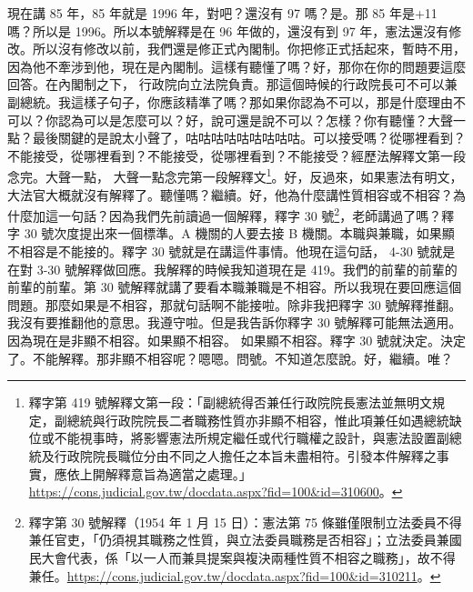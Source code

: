 \hypertarget{c08:cue:67}{}現在講 85 年，85 年就是 1996 年，對吧？還沒有 97 嗎？是。那 85 年是+11 嗎？所以是 1996。所以本號解釋是在 96 年做的，還沒有到 97 年，憲法還沒有修改。所以沒有修改以前，我們還是修正式內閣制。你把修正式括起來，暫時不用，因為他不牽涉到他，現在是內閣制。這樣有聽懂了嗎？好，那你在你的問題要這麼回答。在內閣制之下，
\hypertarget{c08:cue:68}{}行政院向立法院負責。那這個時候的行政院長可不可以兼副總統。我這樣子句子，你應該精準了嗎？那如果你認為不可以，那是什麼理由不可以？你認為可以是怎麼可以？好，說可還是說不可以？怎樣？你有聽懂？大聲一點？最後關鍵的是說太小聲了，咕咕咕咕咕咕咕咕咕。可以接受嗎？從哪裡看到？不能接受，從哪裡看到？不能接受，從哪裡看到？不能接受？經歷法解釋文第一段念完。大聲一點，
\hypertarget{c08:cue:69}{}大聲一點念完第一段解釋文\footnote{釋字第 419 號解釋文第一段：「副總統得否兼任行政院院長憲法並無明文規定，副總統與行政院院長二者職務性質亦非顯不相容，惟此項兼任如遇總統缺位或不能視事時，將影響憲法所規定繼任或代行職權之設計，與憲法設置副總統及行政院院長職位分由不同之人擔任之本旨未盡相符。引發本件解釋之事實，應依上開解釋意旨為適當之處理。」\url{https://cons.judicial.gov.tw/docdata.aspx?fid=100&id=310600}。}。好，反過來，如果憲法有明文，大法官大概就沒有解釋了。聽懂嗎？繼續。好，他為什麼講性質相容或不相容？為什麼加這一句話？因為我們先前讀過一個解釋，釋字 30 號\footnote{釋字第 30 號解釋（1954 年 1 月 15 日）：憲法第 75 條雖僅限制立法委員不得兼任官吏，「仍須視其職務之性質，與立法委員職務是否相容」；立法委員兼國民大會代表，係「以一人而兼具提案與複決兩種性質不相容之職務」，故不得兼任。\url{https://cons.judicial.gov.tw/docdata.aspx?fid=100&id=310211}。}，老師講過了嗎？釋字 30 號次度提出來一個標準。A 機關的人要去接 B 機關。本職與兼職，如果顯不相容是不能接的。釋字 30 號就是在講這件事情。他現在這句話，
\hypertarget{c08:cue:70}{}4-30 號就是在對 3-30 號解釋做回應。我解釋的時候我知道現在是 419。我們的前輩的前輩的前輩的前輩。第 30 號解釋就講了要看本職兼職是不相容。所以我現在要回應這個問題。那麼如果是不相容，那就句話啊不能接啦。除非我把釋字 30 號解釋推翻。我沒有要推翻他的意思。我遵守啦。但是我告訴你釋字 30 號解釋可能無法適用。因為現在是非顯不相容。如果顯不相容。
\hypertarget{c08:cue:71}{}如果顯不相容。釋字 30 號就決定。決定了。不能解釋。那非顯不相容呢？嗯嗯。問號。不知道怎麼說。好，繼續。唯？

